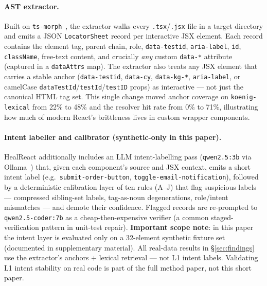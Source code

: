\paragraph{AST extractor.}
Built on \texttt{ts-morph}~\cite{tsmorph}, the extractor walks every \texttt{.tsx}/\texttt{.jsx} file in a target directory and emits a JSON \texttt{LocatorSheet} record per interactive JSX element. Each record contains the element tag, parent chain, role, \texttt{data-testid}, \texttt{aria-label}, \texttt{id}, \texttt{className}, free-text content, and crucially \emph{any} custom \texttt{data-*} attribute (captured in a \texttt{dataAttrs} map). The extractor also treats any JSX element that carries a stable anchor (\texttt{data-testid}, \texttt{data-cy}, \texttt{data-kg-*}, \texttt{aria-label}, or camelCase \texttt{dataTestId}/\texttt{testId}/\texttt{testID} props) as interactive --- not just the canonical HTML tag set. This single change moved anchor coverage on \texttt{koenig-lexical} from 22\% to 48\% and the resolver hit rate from 0\% to 71\%, illustrating how much of modern React's brittleness lives in custom wrapper components.

\paragraph{Intent labeller and calibrator (synthetic-only in this paper).}
HealReact additionally includes an LLM intent-labelling pass (\texttt{qwen2.5:3b} via Ollama~\cite{ollama}) that, given each component's source and JSX context, emits a short intent label (e.g.\ \texttt{submit-order-button}, \texttt{toggle-email-notification}), followed by a deterministic calibration layer of ten rules (A--J) that flag suspicious labels --- compressed sibling-set labels, tag-as-noun degenerations, role/intent mismatches --- and demote their confidence. Flagged records are re-prompted to \texttt{qwen2.5-coder:7b} as a cheap-then-expensive verifier (a common staged-verification pattern in unit-test repair). \textbf{Important scope note}: in this paper the intent layer is evaluated only on a 32-element synthetic fixture set (documented in supplementary material). All real-data results in \S\ref{sec:findings} use the extractor's anchors + lexical retrieval --- not L1 intent labels. Validating L1 intent stability on real code is part of the full method paper, not this short paper.

